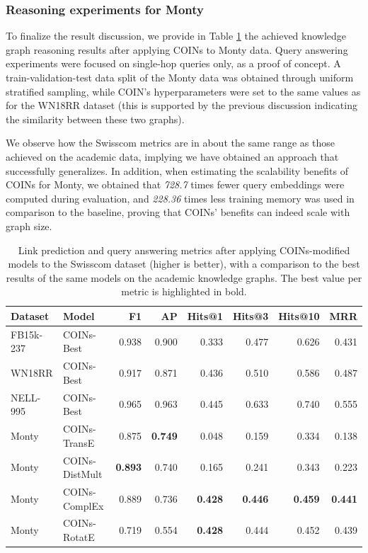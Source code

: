 \subsubsection{Reasoning experiments for Monty}

To finalize the result discussion, we provide in Table \ref{tab:swisscom_coins} the achieved knowledge graph reasoning results after applying COINs to Monty data. Query answering experiments were focused on single-hop queries only, as a proof of concept. A train-validation-test data split of the Monty data was obtained through uniform stratified sampling, while COIN's hyperparameters were set to the same values as for the WN18RR dataset (this is supported by the previous discussion indicating the similarity between these two graphs). 

We observe how the Swisscom metrics are in about the same range as those achieved on the academic data, implying we have obtained an approach that successfully generalizes. In addition, when estimating the scalability benefits of COINs for Monty, we obtained that \emph{728.7} times fewer query embeddings were computed during evaluation, and \emph{228.36} times less training memory was used in comparison to the baseline, proving that COINs' benefits can indeed scale with graph size.


\begin{table}[H]
    \centering
    \caption[Link prediction and query answering metrics after applying COINs-modified models to the Swisscom dataset.]{Link prediction and query answering metrics after applying COINs-modified models to the Swisscom dataset (higher is better), with a comparison to the best results of the same models on the academic knowledge graphs. The best value per metric is highlighted in bold.}
    \label{tab:swisscom_coins}
    \begin{tabular}{llrrrrrr}
    \toprule
         Dataset & Model & F1 & AP & Hits@1 & Hits@3 & Hits@10 & MRR \\
    \midrule
         FB15k-237 & COINs-Best & 0.938 & 0.900 & 0.333 & 0.477 & 0.626 & 0.431 \\
         WN18RR & COINs-Best & 0.917 & 0.871 & 0.436 & 0.510 & 0.586 & 0.487 \\
         NELL-995 & COINs-Best & 0.965 & 0.963 & 0.445 & 0.633 & 0.740 & 0.555 \\
         \midrule
         Monty & COINs-TransE & 0.875 & \textbf{0.749} & 0.048 & 0.159 & 0.334 & 0.138 \\
         Monty & COINs-DistMult & \textbf{0.893} & 0.740 & 0.165 & 0.241 & 0.343 & 0.223 \\
         Monty & COINs-ComplEx & 0.889 & 0.736 & \textbf{0.428} & \textbf{0.446} & \textbf{0.459} & \textbf{0.441} \\
         Monty & COINs-RotatE & 0.719 & 0.554 & \textbf{0.428} & 0.444 & 0.452 & 0.439 \\
    \bottomrule
    \end{tabular}
\end{table}

